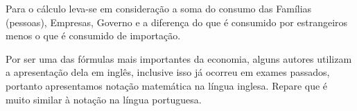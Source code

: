 \documentclass{article}\usepackage[]{graphicx}\usepackage[]{xcolor}
\begin{document}
Para o cálculo leva-se em consideração a soma do consumo das Famílias (pessoas), Empresas, Governo e 
a diferença do que é consumido por estrangeiros menos o que é consumido de importação.\par

\begin{table}[H]
\centering
{}
\end{table}

Por ser uma das fórmulas mais importantes da economia, alguns autores utilizam a apresentação 
dela em inglês, inclusive isso já ocorreu em exames passados, portanto apresentamos notação 
matemática na língua inglesa. Repare que é muito similar à notação na língua portuguesa.\par

\begin{table}[H]
\centering
{}
\end{table}
\end{document}
